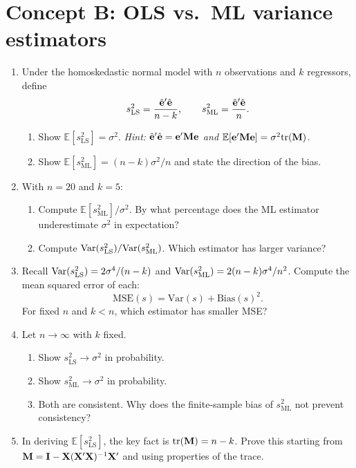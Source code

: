 \documentclass{article}
\newcommand{\E}{\mathbb{E}}
\begin{document}
\bigskip

\section*{Concept B: OLS vs.\ ML variance estimators}

\begin{enumerate}[label=\textbf{B.\arabic*},leftmargin=*,itemsep=10pt]

\item  Under the homoskedastic normal model with $n$ observations and $k$ regressors, define
$$s_{\text{LS}}^2 = \frac{\hat{{\mathbf e}}'\hat{{\mathbf e}}}{n - k}, \qquad s_{\text{ML}}^2 = \frac{\hat{{\mathbf e}}'\hat{{\mathbf e}}}{n}.$$
\begin{enumerate}[label=(\alph*)]
  \item Show $\E[s_{\text{LS}}^2] = \sigma^2$.  \emph{Hint: $\hat{{\mathbf e}}'\hat{{\mathbf e}} = {\mathbf e}'{\mathbf M}{\mathbf e}$ and $\E[\bfe'\bfM\bfe] = \sigma^2 \text{tr}(\bfM)$.}
  \item Show $\E[s_{\text{ML}}^2] = (n-k)\sigma^2/n$ and state the direction of the bias.
\end{enumerate}

\item  With $n = 20$ and $k = 5$:
\begin{enumerate}[label=(\alph*)]
  \item Compute $\E[s_{\text{ML}}^2]/\sigma^2$.  By what percentage does the ML estimator underestimate $\sigma^2$ in expectation?
  \item Compute $\mbox{Var}(s_{\text{LS}}^2)/\mbox{Var}(s_{\text{ML}}^2)$.  Which estimator has larger variance?
\end{enumerate}

\item  Recall $\mbox{Var}(s_{\text{LS}}^2) = 2\sigma^4/(n - k)$ and $\mbox{Var}(s_{\text{ML}}^2) = 2(n-k)\sigma^4/n^2$.  Compute the mean squared error of each:
$$\text{MSE}(s) = \text{Var}(s) + \text{Bias}(s)^2.$$
For fixed $n$ and $k < n$, which estimator has smaller MSE?

\item  Let $n \to \infty$ with $k$ fixed.
\begin{enumerate}[label=(\alph*)]
  \item Show $s_{\text{LS}}^2 \to \sigma^2$ in probability.
  \item Show $s_{\text{ML}}^2 \to \sigma^2$ in probability.
  \item Both are consistent.  Why does the finite-sample bias of $s_{\text{ML}}^2$ not prevent consistency?
\end{enumerate}

\item  In deriving $\E[s_{\text{LS}}^2]$, the key fact is $\text{tr}({\mathbf M}) = n - k$.  Prove this starting from ${\mathbf M} = {\mathbf I} - {\mathbf X}({\mathbf X}'{\mathbf X})^{-1}{\mathbf X}'$ and using properties of the trace.

\end{enumerate}
\end{document}
